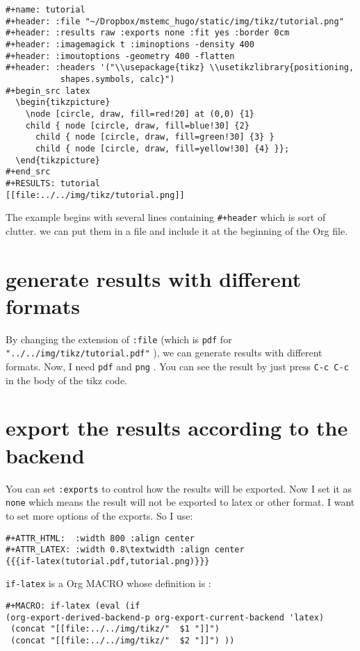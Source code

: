 \documentclass[koma,a4paper,utopia,12pt,listings-color,microtype,paralist,colorlinks,urlcolor=red]{org-article}
\begin{document}
\begin{verbatim}
#+name: tutorial
#+header: :file "~/Dropbox/mstemc_hugo/static/img/tikz/tutorial.png"
#+header: :results raw :exports none :fit yes :border 0cm
#+header: :imagemagick t :iminoptions -density 400
#+header: :imoutoptions -geometry 400 -flatten
#+header: :headers '("\\usepackage{tikz} \\usetikzlibrary{positioning,
           shapes.symbols, calc}")
#+begin_src latex
  \begin{tikzpicture}
    \node [circle, draw, fill=red!20] at (0,0) {1}
    child { node [circle, draw, fill=blue!30] {2}
      child { node [circle, draw, fill=green!30] {3} }
      child { node [circle, draw, fill=yellow!30] {4} }};
  \end{tikzpicture}
#+end_src
#+RESULTS: tutorial
[[file:../../img/tikz/tutorial.png]]
\end{verbatim}

The example begins with several lines containing \texttt{\#+header} which is sort of
clutter. we can put them in a file and include it at the beginning of the Org
file.
\section{generate results with different formats}
\label{sec:org39c9b75}


By changing the extension of \texttt{:file} (which is \texttt{pdf} for
\texttt{"../../img/tikz/tutorial.pdf"} ), we can generate results with different formats.
Now, I need \texttt{pdf} and \texttt{png} . You can see the result by just press \texttt{C-c C-c} in the
body of the tikz code.
\section{export the results according to the backend}
\label{sec:org58238bf}


You can set \texttt{:exports} to control how the results will be exported. Now I set it
as \texttt{none} which means the result will not be exported to latex or other format. I
want to set more options of the exports. So I use:

\begin{verbatim}
#+ATTR_HTML:  :width 800 :align center
#+ATTR_LATEX: :width 0.8\textwidth :align center
{{{if-latex(tutorial.pdf,tutorial.png)}}}
\end{verbatim}

\texttt{if-latex} is a Org MACRO whose definition is :
\begin{verbatim}
#+MACRO: if-latex (eval (if
(org-export-derived-backend-p org-export-current-backend 'latex)
 (concat "[[file:../../img/tikz/"  $1 "]]")
 (concat "[[file:../../img/tikz/"  $2 "]]") ))
\end{verbatim}
\end{document}
